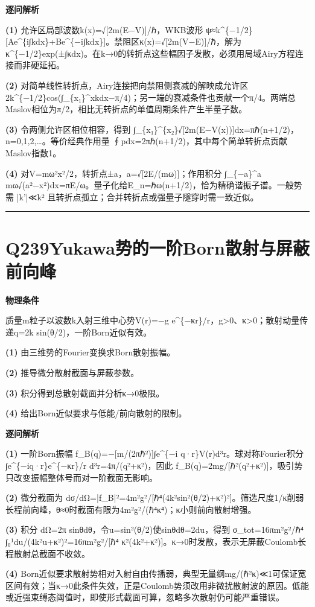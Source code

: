 \documentclass[UTF8,a4paper,11pt,oneside,openany]{ctexbook}
\begin{document}
\par\medskip\noindent\textbf{逐问解析}
\par\noindent\textbf{(1)} 允许区局部波数k(x)=√[2m(E−V)]/ℏ，WKB波形 ψ≈k\textasciicircum{}\{−1/2\}[Ae\textasciicircum{}\{i∫kdx\}+Be\textasciicircum{}\{−i∫kdx\}]。禁阻区κ(x)=√[2m(V−E)]/ℏ，解为κ\textasciicircum{}\{−1/2\}exp(±∫κdx)。在k→0的转折点这些幅因子发散，必须用局域Airy方程连接而非硬延拓。
\par\noindent\textbf{(2)} 对简单线性转折点，Airy连接把向禁阻侧衰减的解映成允许区 2k\textasciicircum{}\{−1/2\}cos(∫\_\{x₁\}\textasciicircum{}xkdx−π/4)；另一端的衰减条件也贡献一个π/4。两端总Maslov相位为π/2，相比无转折点的单值周期条件产生半量子数。
\par\noindent\textbf{(3)} 令两侧允许区相位相容，得到 ∫\_\{x₁\}\textasciicircum{}\{x₂\}√[2m(E−V(x))]dx=πℏ(n+1/2)，n=0,1,2,…。等价经典作用量 ∮pdx=2πℏ(n+1/2)，其中每个简单转折点贡献Maslov指数1。
\par\noindent\textbf{(4)} 对V=mω²x²/2，转折点±a，a=√[2E/(mω)]；作用积分 ∫\_\{−a\}\textasciicircum{}a mω√(a²−x²)dx=πE/ω。量子化给E\_n=ℏω(n+1/2)，恰为精确谐振子谱。一般势需 |k'|≪k² 且转折点孤立；合并转折点或强量子隧穿时需一致近似。

\par\bigskip\hrule\bigskip
\section*{Q239\quad Yukawa势的一阶Born散射与屏蔽前向峰}
\textbf{物理条件}\par 质量m粒子以波数k入射三维中心势V(r)=−g e\textasciicircum{}\{−κr\}/r，g>0、κ>0；散射动量传递q=2k sin(θ/2)，一阶Born近似有效。
\par\noindent\textbf{(1)} 由三维势的Fourier变换求Born散射振幅。
\par\noindent\textbf{(2)} 推导微分散射截面与屏蔽参数。
\par\noindent\textbf{(3)} 积分得到总散射截面并分析κ→0极限。
\par\noindent\textbf{(4)} 给出Born近似要求与低能/前向散射的限制。

\par\medskip\noindent\textbf{逐问解析}
\par\noindent\textbf{(1)} 一阶Born振幅 f\_B(q)=−[m/(2πℏ²)]∫e\textasciicircum{}\{−i q·r\}V(r)d³r。球对称Fourier积分 ∫e\textasciicircum{}\{−iq·r\}e\textasciicircum{}\{−κr\}/r d³r=4π/(q²+κ²)，因此 f\_B(q)=2mg/[ℏ²(q²+κ²)]，吸引势只改变振幅整体号而对一阶截面无影响。
\par\noindent\textbf{(2)} 微分截面为 dσ/dΩ=|f\_B|²=4m²g²/[ℏ⁴(4k²sin²(θ/2)+κ²)²]。筛选尺度1/κ削弱长程前向峰，θ≈0时截面有限为4m²g²/(ℏ⁴κ⁴)；κ小则前向散射增强。
\par\noindent\textbf{(3)} 积分 dΩ=2π sinθdθ，令u=sin²(θ/2)使sinθdθ=2du，得到 σ\_tot=16πm²g²/ℏ⁴ ∫₀¹du/(4k²u+κ²)²=16πm²g²/[ℏ⁴ κ²(4k²+κ²)]。κ→0时发散，表示无屏蔽Coulomb长程散射总截面不收敛。
\par\noindent\textbf{(4)} Born近似要求散射势相对入射自由传播弱，典型无量纲mg/(ℏ²κ)≪1可保证宽区间有效；当κ→0此条件失效，正是Coulomb势须改用非微扰散射波的原因。低能或近强束缚态阈值时，即使形式截面可算，忽略多次散射仍可能严重错误。
\end{document}
